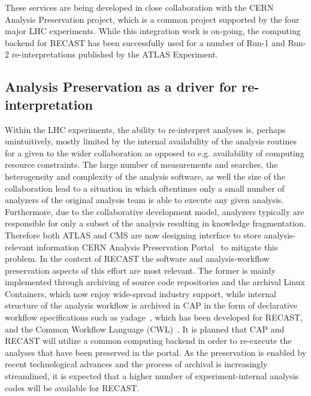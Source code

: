 These services are being developed in close collaboration with the CERN Analysis Preservation project, which is a common project supported by the four major LHC experiments. While this integration work is on-going, the computing backend for RECAST has been successfully used for a number of Run-1 and Run-2 re-interpretations published by the ATLAS Experiment.


\subsection{Analysis Preservation as a driver for re-interpretation}

Within the LHC experiments, the ability to re-interpret analyses is, perhaps unintuitively, mostly limited by the internal availability of the analysis routines for a given to the wider collaboration as opposed to e.g. availability of computing resource constraints. The large number of measurements and searches, the heterogeneity and complexity of the analysis software, as well the size of the collaboration lead to a situation in which oftentimes only a small number of analyzers of the original analysis team is able to execute any given analysis. Furthermore, due to the collaborative development model, analyzers typically are responsible for only a subset of the analysis resulting in knowledge fragmentation. Therefore both ATLAS and CMS are now designing interface to store analysis-relevant information CERN Analysis Preservation Portal~\cite{CAP} to mitigate this problem. In the context of RECAST the software and analysis-workflow preservation aspects of this effort are most relevant. The former is mainly implemented through archiving of source code repositories and the archival Linux Containers, which now enjoy wide-spread industry support, while internal structure of the analysis workflow is archived in CAP in the form of declarative workflow specifications such as yadage~\cite{Cranmer:2017frf}, which has been developed for RECAST, and the Common Workflow Language (CWL)~\cite{CWL}. It is planned that CAP and RECAST will utilize a common computing backend in order to re-execute the analyses that have been preserved in the portal. As the preservation is enabled by recent technological advances and the process of archival is increasingly streamlined, it is expected that a higher number of  experiment-internal analysis codes will be available for RECAST.

